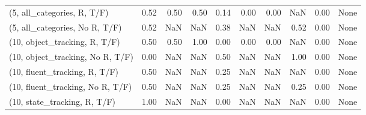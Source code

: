 \begin{table*}[h!]
\begin{adjustbox}{width=2\columnwidth,center}
\begin{tabular}{lrrr|rrr|rrr}
(5, all\_categories, R, T/F)          &                      0.52 &                  0.50 &                      0.50 &                          0.14 &                      0.00 &                          0.00 &                                    NaN &                               0.00 &                                  None \\
(5, all\_categories, No R, T/F)       &                      0.52 &                   NaN &                       NaN &                          0.38 &                       NaN &                           NaN &                                   0.52 &                               0.00 &                                  None \\



\midrule
(10, object\_tracking, R, T/F)         &                      0.50 &                  0.50 &                      1.00 &                          0.00 &                      0.00 &                          0.00 &                                    NaN &                               0.00 &                                  None \\
(10, object\_tracking, No R, T/F)      &                      0.00 &                   NaN &                       NaN &                          0.50 &                       NaN &                           NaN &                                   1.00 &                               0.00 &                                  None \\
(10, fluent\_tracking, R, T/F)         &                      0.50 &                   NaN &                       NaN &                          0.25 &                       NaN &                           NaN &                                    NaN &                               0.00 &                                  None \\
(10, fluent\_tracking, No R, T/F)      &                      0.50 &                   NaN &                       NaN &                          0.25 &                       NaN &                           NaN &                                   0.25 &                               0.00 &                                  None \\
(10, state\_tracking, R, T/F)          &                      1.00 &                   NaN &                       NaN &                          0.00 &                       NaN &                           NaN &                                    NaN &                               0.00 &                                  None \\

\end{tabular}
\end{adjustbox}
\end{table*}
